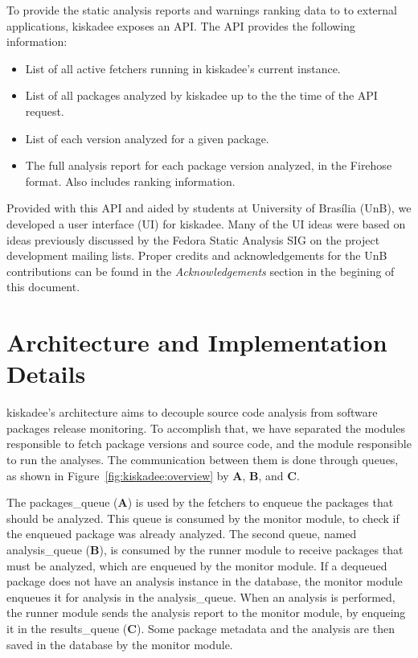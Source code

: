 To provide the static analysis reports and warnings ranking data to to external
applications, kiskadee exposes an API. The API provides the following information:

\begin{itemize}
  \item List of all active fetchers running in kiskadee's current instance.

  \item List of all packages analyzed by kiskadee up to the the time of the API request.

  \item List of each version analyzed for a given package.

  \item The full analysis report for each package version analyzed, in the Firehose format. Also includes ranking information.
\end{itemize}

Provided with this API and aided by students at University of Brasília (UnB),
we developed a user interface (UI) for kiskadee. Many of the UI ideas were
based on ideas previously discussed by the Fedora Static Analysis SIG on the
project development mailing lists. Proper credits and acknowledgements for the
UnB contributions can be found in the \emph{Acknowledgements} section in the
begining of this document.



\section{Architecture and Implementation Details}
\label{sec:implementation}

kiskadee's architecture aims to decouple source code analysis from software
packages release monitoring. To accomplish that, we have separated the modules
responsible to fetch package versions and source code, and the module
responsible to run the analyses. The communication between them is done through
queues, as shown in Figure~\ref{fig:kiskadee:overview} by \textbf{A},
\textbf{B}, and \textbf{C}.

The packages\_queue (\textbf{A}) is used by the fetchers to enqueue the
packages that should be analyzed. This queue is consumed by the monitor module,
to check if the enqueued package was already analyzed. The second queue, named
analysis\_queue (\textbf{B}), is consumed by the runner module to receive
packages that must be analyzed, which are enqueued by the monitor module. If a
dequeued package does not have an analysis instance in the database, the
monitor module enqueues it for analysis in the analysis\_queue.  When an
analysis is performed, the runner module sends the analysis report to the
monitor module, by enqueing it in the results\_queue (\textbf{C}). Some package
metadata and the analysis are then saved in the database by the monitor module.

